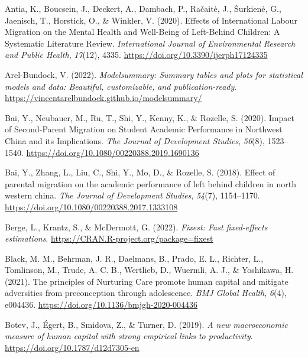 \documentclass[
  man,floatsintext]{apa7}
\newlength{\cslhangindent}
\newlength{\cslentryspacingunit} %
\newenvironment{CSLReferences}[2] %
 {%
  \setlength{\parindent}{0pt}
  \ifodd #1
  \let\oldpar\par
  \def\par{\hangindent=\cslhangindent\oldpar}
  \fi
  \setlength{\parskip}{#2\cslentryspacingunit}
 }%
 {}
\begin{document}
\hypertarget{refs}{}
\begin{CSLReferences}{1}{0}
\leavevmode{}%
Antia, K., Boucsein, J., Deckert, A., Dambach, P., Račaitė, J., Šurkienė, G., Jaenisch, T., Horstick, O., \& Winkler, V. (2020). Effects of International Labour Migration on the Mental Health and Well-Being of Left-Behind Children: A Systematic Literature Review. \emph{International Journal of Environmental Research and Public Health}, \emph{17}(12), 4335. \url{https://doi.org/10.3390/ijerph17124335}

\leavevmode{}%
Arel-Bundock, V. (2022). \emph{Modelsummary: Summary tables and plots for statistical models and data: Beautiful, customizable, and publication-ready}. \url{https://vincentarelbundock.github.io/modelsummary/}

\leavevmode{}%
Bai, Y., Neubauer, M., Ru, T., Shi, Y., Kenny, K., \& Rozelle, S. (2020). Impact of Second-Parent Migration on Student Academic Performance in Northwest China and its Implications. \emph{The Journal of Development Studies}, \emph{56}(8), 1523--1540. \url{https://doi.org/10.1080/00220388.2019.1690136}

\leavevmode{}%
Bai, Y., Zhang, L., Liu, C., Shi, Y., Mo, D., \& Rozelle, S. (2018). Effect of parental migration on the academic performance of left behind children in north western china. \emph{The Journal of Development Studies}, \emph{54}(7), 1154--1170. \url{https://doi.org/10.1080/00220388.2017.1333108}

\leavevmode{}%
Berge, L., Krantz, S., \& McDermott, G. (2022). \emph{Fixest: Fast fixed-effects estimations}. \url{https://CRAN.R-project.org/package=fixest}

\leavevmode{}%
Black, M. M., Behrman, J. R., Daelmans, B., Prado, E. L., Richter, L., Tomlinson, M., Trude, A. C. B., Wertlieb, D., Wuermli, A. J., \& Yoshikawa, H. (2021). The principles of Nurturing Care promote human capital and mitigate adversities from preconception through adolescence. \emph{BMJ Global Health}, \emph{6}(4), e004436. \url{https://doi.org/10.1136/bmjgh-2020-004436}

\leavevmode{}%
Botev, J., Égert, B., Smidova, Z., \& Turner, D. (2019). \emph{A new macroeconomic measure of human capital with strong empirical links to productivity}. \url{https://doi.org/10.1787/d12d7305-en}


\end{CSLReferences}
\end{document}
